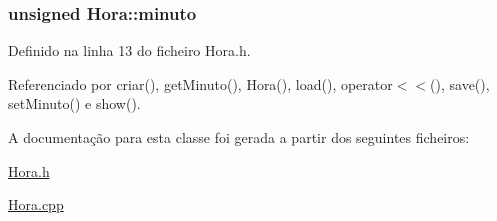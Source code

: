 \hypertarget{class_hora_a9d33ce2d8a3f4b3d05b2a3c6df782fa4}{
\subsubsection[{minuto}]{\setlength{\rightskip}{0pt plus 5cm}unsigned Hora\+::minuto\hspace{0.3cm}{\ttfamily [private]}}}\label{class_hora_a9d33ce2d8a3f4b3d05b2a3c6df782fa4}


Definido na linha 13 do ficheiro Hora.\+h.



Referenciado por criar(), get\+Minuto(), Hora(), load(), operator$<$$<$(), save(), set\+Minuto() e show().



A documentação para esta classe foi gerada a partir dos seguintes ficheiros\+:\begin{DoxyCompactItemize}
\item 
\hyperlink{_hora_8h}{Hora.\+h}\item 
\hyperlink{_hora_8cpp}{Hora.\+cpp}\end{DoxyCompactItemize}
